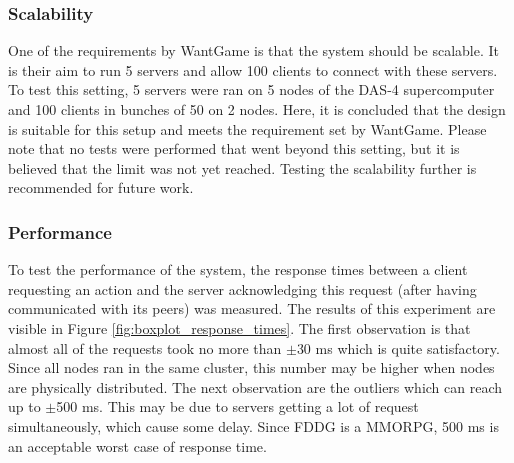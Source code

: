 	\subsubsection{Scalability}
	\label{subsubsec:scalability} 
		One of the requirements by WantGame is that the system should be scalable. It is their aim to run 5 servers and allow 100 clients to connect with these servers.
		To test this setting, 5 servers were ran on 5 nodes of the DAS-4 supercomputer and 100 clients in bunches of 50 on 2 nodes. Here, it is concluded that the design is suitable for this setup and meets the requirement set by WantGame.
		Please note that no tests were performed that went beyond this setting, but it is believed that the limit was not yet reached. Testing the scalability further is recommended for future work.
		
	\subsubsection{Performance}
	\label{subsubsec:performance}
		To test the performance of the system, the response times between a client requesting an action and the server acknowledging this request (after having communicated with its peers) was measured. 
		The results of this experiment are visible in Figure \ref{fig:boxplot_response_times}.
		The first observation is that almost all of the requests took no more than $\pm$30 ms which is quite satisfactory. Since all nodes ran in the same cluster, this number may be higher when nodes are physically distributed.
		The next observation are the outliers which can reach up to $\pm$500 ms. 
		This may be due to servers getting a lot of request simultaneously, which cause some delay.
		Since FDDG is a MMORPG, 500 ms is an acceptable worst case of response time.
		
